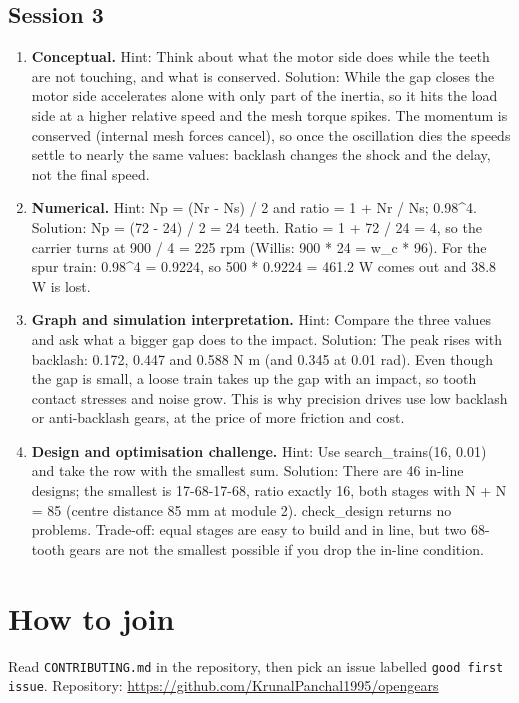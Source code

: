 \documentclass[11pt,a4paper]{article}
\begin{document}
\subsection*{Session 3}
\begin{enumerate}[nosep]
\item \textbf{Conceptual.} Hint: Think about what the motor side does while the teeth are not touching, and what is conserved. Solution: While the gap closes the motor side accelerates alone with only part of the inertia, so it hits the load side at a higher relative speed and the mesh torque spikes. The momentum is conserved (internal mesh forces cancel), so once the oscillation dies the speeds settle to nearly the same values: backlash changes the shock and the delay, not the final speed.
\item \textbf{Numerical.} Hint: Np = (Nr - Ns) / 2 and ratio = 1 + Nr / Ns; 0.98\textasciicircum{}4. Solution: Np = (72 - 24) / 2 = 24 teeth. Ratio = 1 + 72 / 24 = 4, so the carrier turns at 900 / 4 = 225 rpm (Willis: 900 * 24 = w\_c * 96). For the spur train: 0.98\textasciicircum{}4 = 0.9224, so 500 * 0.9224 = 461.2 W comes out and 38.8 W is lost.
\item \textbf{Graph and simulation interpretation.} Hint: Compare the three values and ask what a bigger gap does to the impact. Solution: The peak rises with backlash: 0.172, 0.447 and 0.588 N m (and 0.345 at 0.01 rad). Even though the gap is small, a loose train takes up the gap with an impact, so tooth contact stresses and noise grow. This is why precision drives use low backlash or anti-backlash gears, at the price of more friction and cost.
\item \textbf{Design and optimisation challenge.} Hint: Use search\_trains(16, 0.01) and take the row with the smallest sum. Solution: There are 46 in-line designs; the smallest is 17-68-17-68, ratio exactly 16, both stages with N + N = 85 (centre distance 85 mm at module 2). check\_design returns no problems. Trade-off: equal stages are easy to build and in line, but two 68-tooth gears are not the smallest possible if you drop the in-line condition.
\end{enumerate}

\section{How to join}
Read \texttt{CONTRIBUTING.md} in the repository, then pick an issue labelled \texttt{good first issue}. Repository: \url{https://github.com/KrunalPanchal1995/opengears}
\end{document}
